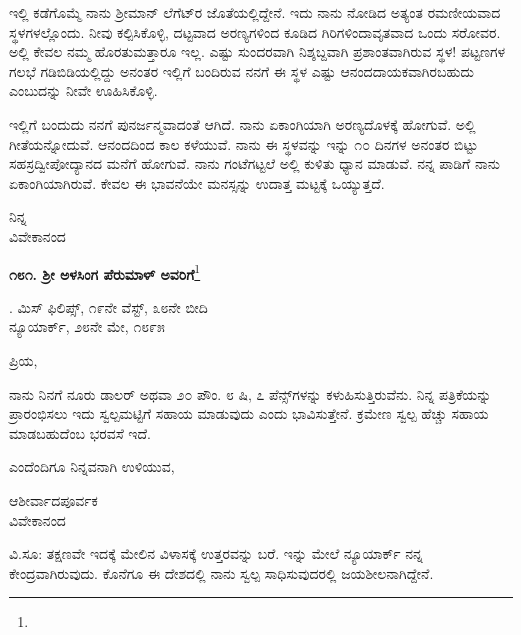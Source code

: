 ಇಲ್ಲಿ ಕಡೆಗೊಮ್ಮೆ ನಾನು ಶ‍್ರೀಮಾನ್ ಲೆಗೆಟ್‌ರ ಜೊತೆಯಲ್ಲಿದ್ದೇನೆ. ಇದು ನಾನು ನೋಡಿದ ಅತ್ಯಂತ ರಮಣೀಯವಾದ ಸ್ಥಳಗಳಲ್ಲೊಂದು. ನೀವು ಕಲ್ಪಿಸಿಕೊಳ್ಳಿ, ದಟ್ಟವಾದ ಅರಣ್ಯಗಳಿಂದ ಕೂಡಿದ ಗಿರಿಗಳಿಂದಾವೃತವಾದ ಒಂದು ಸರೋವರ. ಅಲ್ಲಿ ಕೇವಲ ನಮ್ಮ ಹೊರತುಮತ್ತಾರೂ ಇಲ್ಲ. ಎಷ್ಟು ಸುಂದರವಾಗಿ ನಿಶ್ಶಬ್ದವಾಗಿ ಪ್ರಶಾಂತವಾಗಿರುವ ಸ್ಥಳ! ಪಟ್ಟಣಗಳ ಗಲಭೆ ಗಡಿಬಿಡಿಯಲ್ಲಿದ್ದು ಅನಂತರ ಇಲ್ಲಿಗೆ ಬಂದಿರುವ ನನಗೆ ಈ ಸ್ಥಳ ಎಷ್ಟು ಆನಂದದಾಯಕವಾಗಿರಬಹುದು ಎಂಬುದನ್ನು ನೀವೇ ಊಹಿಸಿಕೊಳ್ಳಿ.

ಇಲ್ಲಿಗೆ ಬಂದುದು ನನಗೆ ಪುನರ್ಜನ್ಮವಾದಂತೆ ಆಗಿದೆ. ನಾನು ಏಕಾಂಗಿಯಾಗಿ ಅರಣ್ಯದೊಳಕ್ಕೆ ಹೋಗುವೆ. ಅಲ್ಲಿ ಗೀತೆಯನ್ನೋದುವೆ. ಆನಂದದಿಂದ ಕಾಲ ಕಳೆಯುವೆ. ನಾನು ಈ ಸ್ಥಳವನ್ನು ಇನ್ನು ೧೦ ದಿನಗಳ ಅನಂತರ ಬಿಟ್ಟು ಸಹಸ್ರದ್ವೀಪೋದ್ಯಾನದ ಮನೆಗೆ ಹೋಗುವೆ. ನಾನು ಗಂಟೆಗಟ್ಟಲೆ ಅಲ್ಲಿ ಕುಳಿತು ಧ್ಯಾನ ಮಾಡುವೆ. ನನ್ನ ಪಾಡಿಗೆ ನಾನು ಏಕಾಂಗಿಯಾಗಿರುವೆ. ಕೇವಲ ಈ ಭಾವನೆಯೇ ಮನಸ್ಸನ್ನು ಉದಾತ್ತ ಮಟ್ಟಕ್ಕೆ ಒಯ್ಯುತ್ತದೆ.

\vspace{-0.5cm}

ನಿನ್ನ\\ವಿವೇಕಾನಂದ

\begin{center}
\textbf{೧೮೧. ಶ‍್ರೀ ಅಳಸಿಂಗ ಪೆರುಮಾಳ್ ಅವರಿಗೆ}\footnote{}
\end{center}

\vspace{-0.5cm}

\begin{flushright}
. ಮಿಸ್ ಫಿಲಿಪ್ಸ್, ೧೯ನೇ ವೆಸ್ಟ್, ೩೮ನೇ ಬೀದಿ\\ನ್ಯೂಯಾರ್ಕ್, ೨೮ನೇ ಮೇ, ೧೮೯೫
\end{flushright}


\vspace{-0.5cm}

\noindent
ಪ್ರಿಯ,

ನಾನು ನಿನಗೆ ನೂರು ಡಾಲರ್ ಅಥವಾ ೨೦ ಪೌಂ. ೮ ಷಿ, ೭ ಪೆನ್ಸ್‌ಗಳನ್ನು ಕಳುಹಿಸುತ್ತಿರುವೆನು. ನಿನ್ನ ಪತ್ರಿಕೆಯನ್ನು ಪ್ರಾರಂಭಿಸಲು ಇದು ಸ್ವಲ್ಪಮಟ್ಟಿಗೆ ಸಹಾಯ ಮಾಡುವುದು ಎಂದು ಭಾವಿಸುತ್ತೇನೆ. ಕ್ರಮೇಣ ಸ್ವಲ್ಪ ಹೆಚ್ಚು ಸಹಾಯ ಮಾಡಬಹುದೆಂಬ ಭರವಸೆ ಇದೆ.

ಎಂದೆಂದಿಗೂ ನಿನ್ನವನಾಗಿ ಉಳಿಯುವ,

\vspace{-0.5cm}

\begin{flushright}
ಆಶೀರ್ವಾದಪೂರ್ವಕ\\ವಿವೇಕಾನಂದ
\end{flushright}

ವಿ.ಸೂ:\enginline{-} ತಕ್ಷಣವೇ ಇದಕ್ಕೆ ಮೇಲಿನ ವಿಳಾಸಕ್ಕೆ ಉತ್ತರವನ್ನು ಬರೆ. ಇನ್ನು ಮೇಲೆ ನ್ಯೂಯಾರ್ಕ್ ನನ್ನ ಕೇಂದ್ರವಾಗಿರುವುದು. ಕೊನೆಗೂ ಈ ದೇಶದಲ್ಲಿ ನಾನು ಸ್ವಲ್ಪ ಸಾಧಿಸುವುದರಲ್ಲಿ ಜಯಶೀಲನಾಗಿದ್ದೇನೆ.

